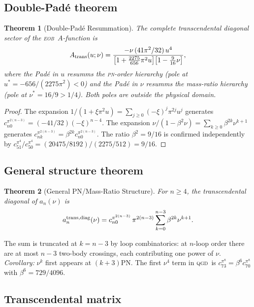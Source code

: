 \documentclass[twocolumn,aps,prd,showpacs,superscriptaddress,floatfix]{revtex4-2}
\newcommand{\QGD}{\textsc{qgd}}
\newcommand{\EOB}{\textsc{eob}}
\newcommand{\PN}{\textsc{pn}}
\newtheorem{theorem}{Theorem}
\begin{document}
\subsection{Double-Pad\'e theorem}

\begin{theorem}[Double-Pad\'e Resummation]
\label{thm:double}
The complete transcendental diagonal sector of the \EOB\ $A$-function is
\begin{equation}
  A_{\rm trans}(u;\nu) =
    \frac{-\nu\,(41\pi^2/32)\,u^4}
         {\bigl[1+\tfrac{2275}{656}\pi^2 u\bigr]
          \bigl[1-\tfrac{9}{16}\nu\bigr]},
  \label{eq:double}
\end{equation}
where the Pad\'e in $u$ resumms the \PN-order hierarchy (pole at
$u^*=-656/(2275\pi^2)<0$) and the Pad\'e in $\nu$ resumms the
mass-ratio hierarchy (pole at $\nu^*=16/9>1/4$).
Both poles are outside the physical domain.
\end{theorem}

\begin{proof}
The expansion $1/(1+\xi\pi^2u)=\sum_{j\ge0}(-\xi)^j\pi^{2j}u^j$
generates $c_{n0}^{\pi^{2(n-3)}}=(-41/32)(-\xi)^{n-4}$.
The expansion $\nu/(1-\beta^2\nu)=\sum_{k\ge0}\beta^{2k}\nu^{k+1}$
generates $c_{nk}^{\pi^{2(n-3)}}=\beta^{2k}c_{n0}^{\pi^{2(n-3)}}$.
The ratio $\beta^2=9/16$ is confirmed independently by
$c_{51}^{\pi^4}/c_{50}^{\pi^4}=(20475/8192)/(2275/512)=9/16$.
\end{proof}

\subsection{General structure theorem}

\begin{theorem}[General PN/Mass-Ratio Structure]
\label{thm:gen}
For $n\ge4$, the transcendental diagonal of $a_n(\nu)$ is
\begin{equation}
  a_n^{\rm trans,diag}(\nu) =
    c_{n0}^{\pi^{2(n-3)}}\,\pi^{2(n-3)}
    \sum_{k=0}^{n-3}\beta^{2k}\nu^{k+1}.
  \label{eq:gen}
\end{equation}
\end{theorem}
The sum is truncated at $k=n-3$ by loop combinatorics: at $n$-loop
order there are at most $n-3$ two-body crossings, each contributing
one power of $\nu$.
\textit{Corollary:} $\nu^k$ first appears at $(k+3)$PN.
The first $\nu^4$ term in \QGD\ is $c_{73}^{\pi^8}=\beta^6c_{70}^{\pi^8}$
with $\beta^6=729/4096$.

\subsection{Transcendental matrix}
\end{document}
